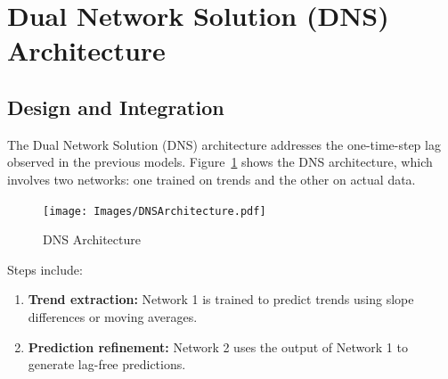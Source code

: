 \section{Dual Network Solution (DNS) Architecture}
\subsection{Design and Integration}
The Dual Network Solution (DNS) architecture addresses the one-time-step lag observed in the previous models. Figure~\ref{fig:DNSArch} shows the DNS architecture, which involves two networks: one trained on trends and the other on actual data.

\begin{figure}[h!]
    \centering
    \texttt{[image: Images/DNSArchitecture.pdf]} %
    \caption{DNS Architecture}
    \label{fig:DNSArch}
\end{figure}

Steps include:
\begin{enumerate}
    \item \textbf{Trend extraction:} Network 1 is trained to predict trends using slope differences or moving averages.
    \item \textbf{Prediction refinement:} Network 2 uses the output of Network 1 to generate lag-free predictions.
\end{enumerate}


